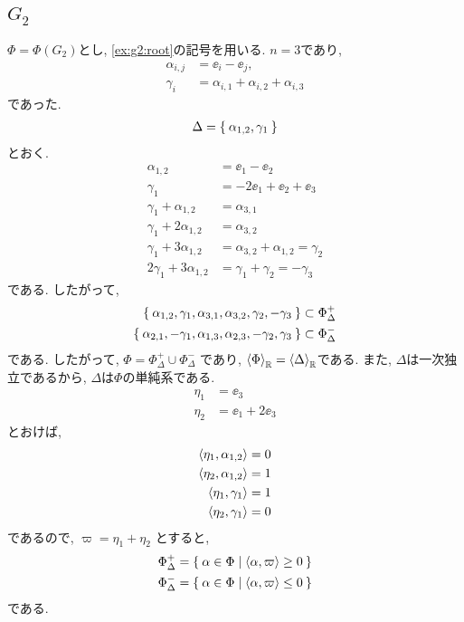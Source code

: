\subsection{$G_2$}
$\Phi=\Phi(G_2)$とし,
\cref{ex:g2:root}の記号を用いる.
$n=3$であり,
\begin{align*}
  \alpha_{i,j}&=\ee_i-\ee_j,\\
  \gamma_{i}&=\alpha_{i,1}+\alpha_{i,2}+\alpha_{i,3}
\end{align*}
であった.
\begin{align*}
  \Delta=\Set{\alpha_{1,2},\gamma_{1}}
\end{align*}
とおく.
\begin{align*}
  \alpha_{1,2}&=\ee_1-\ee_2\\
  \gamma_{1}&=-2\ee_1+\ee_2+\ee_3\\
  \gamma_{1}+\alpha_{1,2}&=\alpha_{3,1}\\
  \gamma_{1}+2\alpha_{1,2}&=\alpha_{3,2}\\
  \gamma_{1}+3\alpha_{1,2}&=\alpha_{3,2}+\alpha_{1,2}=\gamma_{2}\\
  2\gamma_{1}+3\alpha_{1,2}&=\gamma_1+\gamma_{2}=-\gamma_3
\end{align*}
である.  したがって,
\begin{align*}
\Set{ \alpha_{1,2},\gamma_{1}, \alpha_{3,1},\alpha_{3,2},\gamma_{2},-\gamma_3}
&\subset
  \Phi_\Delta^+\\
\Set{ \alpha_{2,1},-\gamma_{1}, \alpha_{1,3},\alpha_{2,3},-\gamma_{2},\gamma_3}
&\subset
  \Phi_\Delta^-
\end{align*}
である.
したがって, $\Phi=\Phi_\Delta^+\cup\Phi_\Delta^-$
であり, $\Braket{\Phi}_{\mathbb{R}}=\Braket{\Delta}_{\mathbb{R}}$である.
また, $\Delta$は一次独立であるから,
$\Delta$は$\Phi$の単純系である.
\begin{align*}
  \eta_1&=\ee_3\\
  \eta_2&=\ee_1+2\ee_3
\end{align*}
とおけば,
\begin{align*}
  \Braket{\eta_1,\alpha_{1,2}}&=0\\
  \Braket{\eta_2,\alpha_{1,2}}&=1\\
  \Braket{\eta_1,\gamma_{1}}&=1\\
  \Braket{\eta_2,\gamma_{1}}&=0\\
\end{align*}
であるので, $\varpi=\eta_1+\eta_2$
  とすると,
\begin{align*}
\Phi_\Delta^+&=\Set{\alpha\in\Phi|\Braket{\alpha,\varpi}\geq 0}\\
\Phi_\Delta^-&=\Set{\alpha\in\Phi|\Braket{\alpha,\varpi}\leq 0}
\end{align*}
である.


